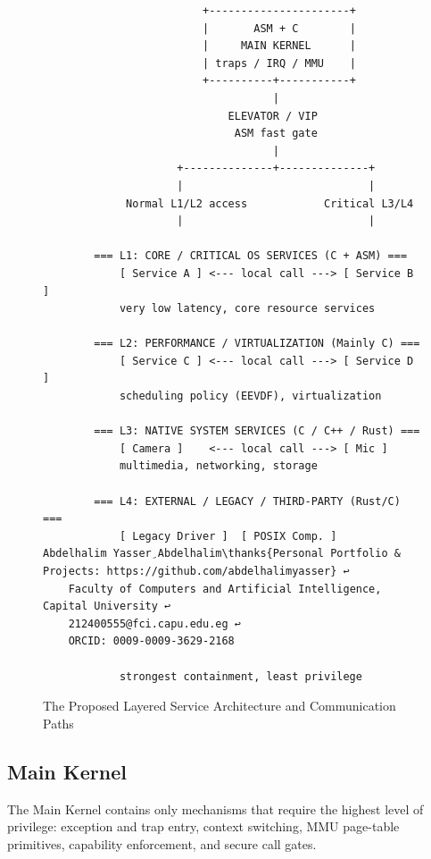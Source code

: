 \documentclass[10pt, a4paper, twocolumn]{article}
\begin{document}
\begin{figure}[htbp]
\centering
\footnotesize
\begin{verbatim}
                         +----------------------+
                         |       ASM + C        |
                         |     MAIN KERNEL      |
                         | traps / IRQ / MMU    |
                         +----------+-----------+
                                    |
                             ELEVATOR / VIP
                              ASM fast gate
                                    |
                     +--------------+--------------+
                     |                             |
             Normal L1/L2 access            Critical L3/L4
                     |                             |

        === L1: CORE / CRITICAL OS SERVICES (C + ASM) ===
            [ Service A ] <--- local call ---> [ Service B ]
            very low latency, core resource services

        === L2: PERFORMANCE / VIRTUALIZATION (Mainly C) ===
            [ Service C ] <--- local call ---> [ Service D ]
            scheduling policy (EEVDF), virtualization

        === L3: NATIVE SYSTEM SERVICES (C / C++ / Rust) ===
            [ Camera ]    <--- local call ---> [ Mic ]
            multimedia, networking, storage

        === L4: EXTERNAL / LEGACY / THIRD-PARTY (Rust/C) ===
            [ Legacy Driver ]  [ POSIX Comp. ]    Abdelhalim Yasser ِAbdelhalim\thanks{Personal Portfolio & Projects: https://github.com/abdelhalimyasser} ↩
    Faculty of Computers and Artificial Intelligence, Capital University ↩
    212400555@fci.capu.edu.eg ↩
    ORCID: 0009-0009-3629-2168

            strongest containment, least privilege
\end{verbatim}
\caption{The Proposed Layered Service Architecture and Communication Paths}
\end{figure}

\subsection{Main Kernel}
The Main Kernel contains only mechanisms that require the highest level of privilege: exception and trap entry, context switching, MMU page-table primitives, capability enforcement, and secure call gates.
\end{document}
